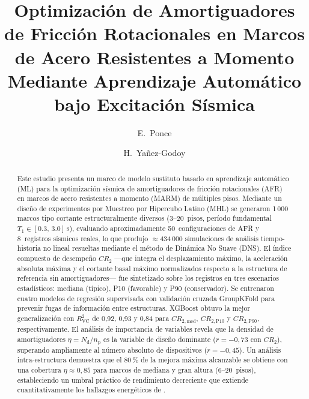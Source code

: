 \documentclass[preprint,12pt,authoryear]{elsarticle}
\newcommand{\CR}[1]{CR_{2,\text{#1}}}
\newcommand{\Rsq}{R^{2}_{\mathrm{VC}}}
\newcommand{\nd}{N_{\mathrm{d}}}
\newcommand{\np}{n_{\mathrm{p}}}              %
\newcommand{\etad}{\eta}
\begin{document}
\begin{frontmatter}

\title{Optimización de Amortiguadores de Fricción Rotacionales en Marcos de
       Acero Resistentes a Momento Mediante Aprendizaje Automático bajo
       Excitación Sísmica}

\author[uaq]{E.~Ponce}
\author[i2m]{H.~Yañez-Godoy}

\address[uaq]{Universidad Autónoma de Querétaro, Facultad de Ingeniería,
              Cerro de las Campanas s/n, Querétaro, México}
\address[i2m]{Arts et Metiers Institute of Technology, University of Bordeaux,
              Centre National de la Recherche Scientifique (CNRS),
              Bordeaux INP, I2M, UMR 5295, 33400 Talence, France}

\begin{abstract}
Este estudio presenta un marco de modelo sustituto basado en aprendizaje
automático (ML) para la optimización sísmica de amortiguadores de fricción
rotacionales (AFR) en marcos de acero resistentes a momento (MARM) de múltiples
pisos. Mediante un diseño de experimentos por Muestreo por Hipercubo Latino
(MHL) se generaron 1\,000 marcos tipo cortante estructuralmente diversos
(3--20~pisos, período fundamental $T_1 \in [0.3,\,3.0]$\,s), evaluando
aproximadamente 50~configuraciones de AFR y 8~registros sísmicos reales, lo que
produjo $\approx$434\,000 simulaciones de análisis tiempo-historia no lineal
resueltas mediante el método de Dinámica No Suave (DNS). El índice compuesto de
desempeño $CR_2$ ---que integra el desplazamiento máximo, la aceleración
absoluta máxima y el cortante basal máximo normalizados respecto a la estructura
de referencia sin amortiguadores--- fue sintetizado sobre los registros en tres
escenarios estadísticos: mediana (típico), P10 (favorable) y P90 (conservador).
Se entrenaron cuatro modelos de regresión supervisada con validación cruzada
GroupKFold para prevenir fugas de información entre estructuras. XGBoost obtuvo
la mejor generalización con $\Rsq$ de 0{,}92, 0{,}93 y 0{,}84 para
$\CR{med}$, $\CR{P10}$ y $\CR{P90}$, respectivamente. El análisis de
importancia de variables revela que la densidad de amortiguadores
$\etad = \nd/\np$ es la variable de diseño dominante ($r=-0{,}73$ con
$CR_2$), superando ampliamente al número absoluto de dispositivos
($r=-0{,}45$). Un análisis intra-estructura demuestra que el 80\,\% de la
mejora máxima alcanzable se obtiene con una cobertura $\etad \approx 0{,}85$
para marcos de mediana y gran altura (6--20~pisos), estableciendo un umbral
práctico de rendimiento decreciente que extiende cuantitativamente los
hallazgos energéticos de \citet{Jarrahi2020sdee}.
\end{abstract}


\end{frontmatter}
\end{document}
